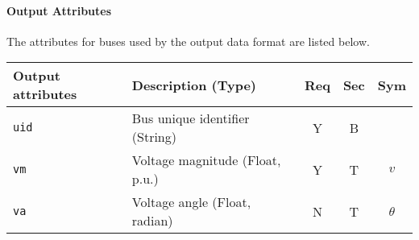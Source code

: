 \documentclass{article}
\newcounter{todo}[section] \setcounter{todo}{0}
\renewcommand{\thetodo}{\arabic{section}.\arabic{todo}}
\newenvironment{todo}[2][]{%
\refstepcounter{todo}%
\ifstrempty{#1}%
{\mdfsetup{%
frametitle={%
\tikz[baseline=(current bounding box.east),outer sep=0pt]
\node[anchor=east,rectangle,fill=red!20]
{\strut To Be Discussed~\thetodo};}}
}%
{\mdfsetup{%
frametitle={%
\tikz[baseline=(current bounding box.east),outer sep=0pt]
\node[anchor=east,rectangle,fill=red!20]
{\strut To Be Discussed~\thetodo:~#1};}}%
}%
\mdfsetup{innertopmargin=10pt,linecolor=red!20,%
linewidth=2pt,topline=true,%
frametitleaboveskip=\dimexpr-\ht\strutbox\relax
}
\begin{mdframed}[]\relax%
\label{#2}}{\end{mdframed}}
\begin{document}
\paragraph{Output Attributes} The attributes for buses used by the output data format are listed below.

\begin{center}
\small
\begin{tabular}{ l | l | c | c | c |}
Output attributes & Description (Type) & Req & Sec & Sym\\
\hline
  {\tt uid} & Bus unique identifier (String) & Y & B & \\
  {\tt vm} & Voltage magnitude (Float, p.u.) & Y & T & $v$ \\
  {\tt va} & Voltage angle (Float, radian)   & N & T & $\theta$\\
\hline
\end{tabular}
\end{center}


\end{document}

